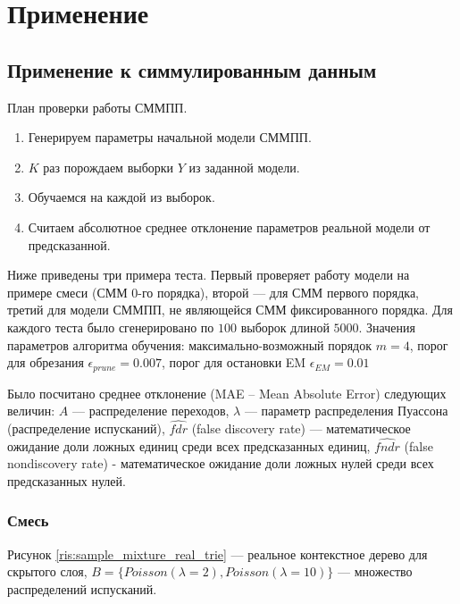 \documentclass{matmex-diploma-custom}
\begin{document}
\section{Применение}
\subsection{Применение к симмулированным данным}
План проверки работы СММПП.
\begin{enumerate}
\item
Генерируем параметры начальной модели СММПП.
\item
$K$ раз порождаем выборки $ Y $ из заданной модели.
\item
Обучаемся на каждой из выборок.
\item
Считаем абсолютное среднее отклонение параметров реальной модели от предсказанной. 
\end{enumerate}

Ниже приведены три примера теста. Первый проверяет работу модели на примере смеси (СММ 0-го порядка), второй --- для СММ первого порядка, третий для модели СММПП, не являющейся СММ фиксированного порядка. Для каждого теста было сгенерировано по $100$ выборок длиной $5000$.
Значения параметров алгоритма обучения: максимально-возможный порядок $m=4$, порог для обрезания $ \epsilon_{\textit{prune}} = 0.007$, порог для остановки EM $\epsilon_{\textit{EM}} =  0.01 $ 

Было посчитано среднее отклонение (MAE -- Mean Absolute Error)
следующих величин: $A$ --- распределение переходов, $\lambda$ --- параметр распределения Пуассона (распределение испусканий), $\hat{\textit{fdr}}$ (false discovery rate) --- математическое ожидание доли ложных единиц среди всех предсказанных единиц, $\hat{\textit{fndr}}$ (false nondiscovery rate) - математическое ожидание доли ложных нулей среди всех предсказанных нулей. 
\subsubsection{Смесь}
Рисунок \ref{ris:sample_mixture_real_trie} --- реальное контекстное дерево для скрытого слоя, 
$B = \{\textit{Poisson}(\lambda=2), \textit{Poisson}(\lambda=10)\}$ --- 
множество распределений испусканий.
\end{document}
